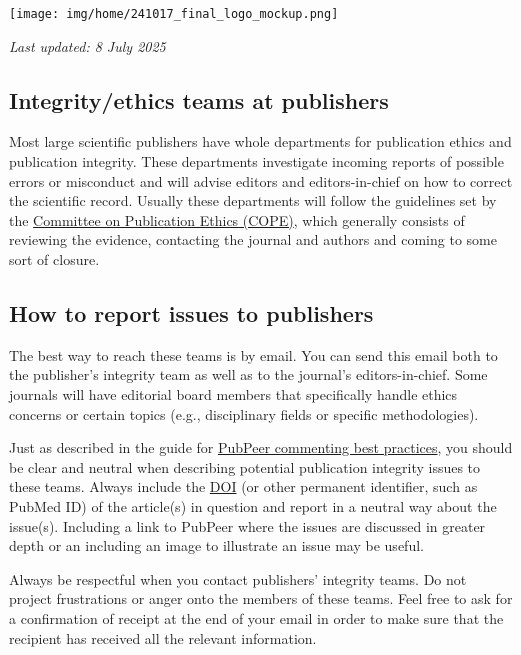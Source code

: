 \documentclass[letterpaper, 12pt]{article}
\begin{document}
\flushleft\texttt{[image: img/home/241017\_final\_logo\_mockup.png]}

\textit{Last updated: 8 July 2025}

\subsection*{Integrity/ethics teams at publishers}

Most large scientific publishers have whole departments for publication ethics and publication integrity. These departments investigate incoming reports of possible errors or misconduct and will advise editors and editors-in-chief on how to correct the scientific record. Usually these departments will follow the guidelines set by the \href{https://publicationethics.org/}{Committee on Publication Ethics (COPE)}, which generally consists of reviewing the evidence, contacting the journal and authors and coming to some sort of closure.

\subsection*{How to report issues to publishers}

The best way to reach these teams is by email. You can send this email both to the publisher's integrity team as well as to the journal's editors-in-chief. Some journals will have editorial board members that specifically handle ethics concerns or certain topics (e.g., disciplinary fields or specific methodologies).

Just as described in the guide for \href{https://osf.io/sghaq}{PubPeer commenting best practices}, you should be clear and neutral when describing potential publication integrity issues to these teams. Always include the \href{https://www.doi.org/}{DOI} (or other permanent identifier, such as PubMed ID) of the article(s) in question and report in a neutral way about the issue(s). Including a link to PubPeer where the issues are discussed in greater depth or an including an image to illustrate an issue may be useful.

Always be respectful when you contact publishers' integrity teams. Do not project frustrations or anger onto the members of these teams. Feel free to ask for a confirmation of receipt at the end of your email in order to make sure that the recipient has received all the relevant information.
\end{document}
